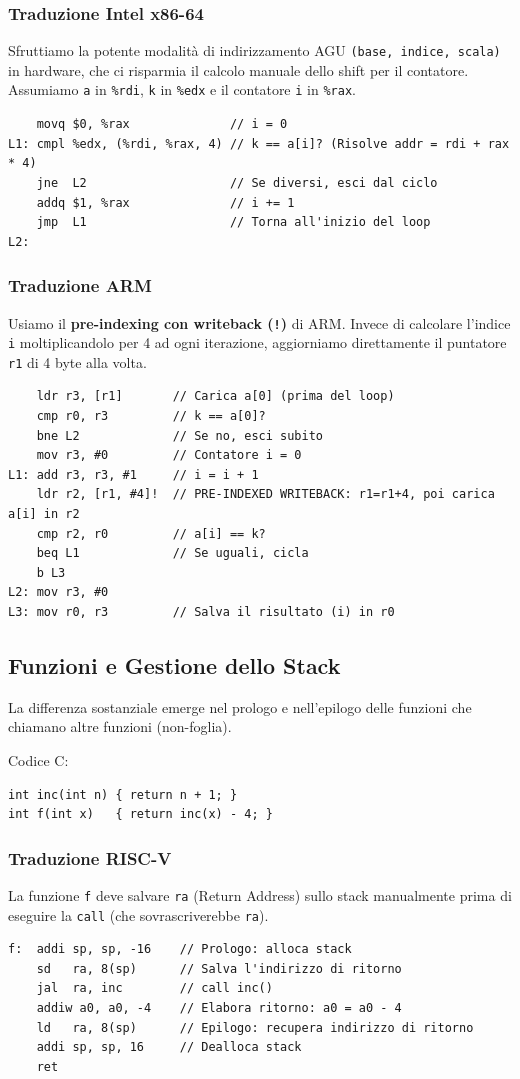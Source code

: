 \documentclass[12pt, a4paper]{article}
\begin{document}
\subsubsection{Traduzione Intel x86-64}
Sfruttiamo la potente modalità di indirizzamento AGU \texttt{(base, indice, scala)} in hardware, che ci risparmia il calcolo manuale dello shift per il contatore. Assumiamo \texttt{a} in \texttt{\%rdi}, \texttt{k} in \texttt{\%edx} e il contatore \texttt{i} in \texttt{\%rax}.
\begin{verbatim}
    movq $0, %rax              // i = 0
L1: cmpl %edx, (%rdi, %rax, 4) // k == a[i]? (Risolve addr = rdi + rax * 4)
    jne  L2                    // Se diversi, esci dal ciclo
    addq $1, %rax              // i += 1
    jmp  L1                    // Torna all'inizio del loop
L2:
\end{verbatim}

\newpage

\subsubsection{Traduzione ARM}
Usiamo il \textbf{pre-indexing con writeback (\texttt{!})} di ARM. Invece di calcolare l'indice \texttt{i} moltiplicandolo per 4 ad ogni iterazione, aggiorniamo direttamente il puntatore \texttt{r1} di 4 byte alla volta.
\begin{verbatim}
    ldr r3, [r1]       // Carica a[0] (prima del loop)
    cmp r0, r3         // k == a[0]?
    bne L2             // Se no, esci subito
    mov r3, #0         // Contatore i = 0
L1: add r3, r3, #1     // i = i + 1
    ldr r2, [r1, #4]!  // PRE-INDEXED WRITEBACK: r1=r1+4, poi carica a[i] in r2
    cmp r2, r0         // a[i] == k?
    beq L1             // Se uguali, cicla
    b L3
L2: mov r3, #0
L3: mov r0, r3         // Salva il risultato (i) in r0
\end{verbatim}

\subsection{Funzioni e Gestione dello Stack}
La differenza sostanziale emerge nel prologo e nell'epilogo delle funzioni che chiamano altre funzioni (non-foglia).

Codice C:
\begin{verbatim}
int inc(int n) { return n + 1; }
int f(int x)   { return inc(x) - 4; }
\end{verbatim}

\subsubsection{Traduzione RISC-V}
La funzione \texttt{f} deve salvare \texttt{ra} (Return Address) sullo stack manualmente prima di eseguire la \texttt{call} (che sovrascriverebbe \texttt{ra}).
\begin{verbatim}
f:  addi sp, sp, -16    // Prologo: alloca stack
    sd   ra, 8(sp)      // Salva l'indirizzo di ritorno
    jal  ra, inc        // call inc()
    addiw a0, a0, -4    // Elabora ritorno: a0 = a0 - 4
    ld   ra, 8(sp)      // Epilogo: recupera indirizzo di ritorno
    addi sp, sp, 16     // Dealloca stack
    ret
\end{verbatim}
\end{document}
